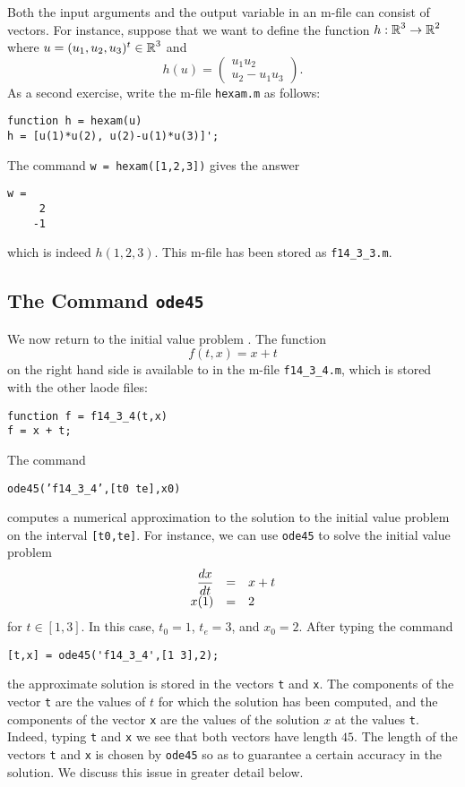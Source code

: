 \documentclass{ximera}
\begin{document}
Both the input arguments and the output variable in an m-file can consist of 
vectors.  For instance, suppose that we want to define the function 
$h:\mbox{$\Bbb{R}$}^3\to\mbox{$\Bbb{R}$}^2$ where $u=(u_1,u_2,u_3)^t\in\mbox{$\Bbb{R}$}^3$ and  
\begin{equation*}
h(u) = \left(\begin{array}{c} u_1 u_2\\ u_2-u_1 u_3 \end{array}\right).
\end{equation*}
As a second exercise, write the m-file {\tt hexam.m} 
as follows:
\begin{verbatim}
function h = hexam(u)
h = [u(1)*u(2), u(2)-u(1)*u(3)]';
\end{verbatim}
The command {\tt w = hexam([1,2,3])} gives the answer
\begin{verbatim}
w =
     2
    -1
\end{verbatim}
which is indeed $h(1,2,3)$.  This m-file has been stored as {\tt f14\_3\_3.m}.

\subsection*{The \Matlab Command {\tt ode45}}

We now return to the initial value problem .
The function 
\begin{equation*}
f(t,x)=x+t
\end{equation*}
on the right hand side is available to \Matlab in the m-file 
{\tt f14\_3\_4.m}, which is stored with the other {\sf laode\/} files: 
\begin{verbatim}
function f = f14_3_4(t,x)
f = x + t;
\end{verbatim}

The \Matlab command 
\begin{center}
{\tt ode45('f14\_3\_4',[t0 te],x0)}
\end{center} 
computes a numerical approximation to the solution to the initial value 
problem  on the interval {\tt [t0,te]}.
For instance, we can use {\tt ode45} to solve the initial value problem
\begin{equation}  \label{eq:fexam1}
\begin{array}{rcl}
\displaystyle \frac{dx}{dt} & = & x+t \\
x(1) & = & 2
\end{array}
\end{equation}
for $t\in[1,3]$. In this case, $t_0=1$, $t_e=3$, and $x_0=2$.  After 
typing the command
\begin{verbatim}
[t,x] = ode45('f14_3_4',[1 3],2);
\end{verbatim}
the approximate solution is stored in the vectors {\tt t} and {\tt x}.
The components of the vector {\tt t} are the values of $t$ for which the 
solution has been computed, and the components of the vector {\tt x} are 
the values of the solution $x$ at the values {\tt t}.  Indeed, typing 
{\tt t} and {\tt x} we see that both vectors have length $45$.   The
length of the vectors {\tt t} and {\tt x} is chosen by {\tt ode45} so
as to guarantee a certain accuracy in the solution.  We discuss this 
issue in greater detail below.
\end{document}

